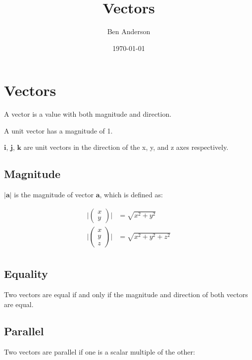 \documentclass[a4paper,11pt]{article}
\newcommand{\bb}{\boldsymbol}
\begin{document}
\title{Vectors}
\author{Ben Anderson}
\date{\today}
\maketitle
\pagebreak

\tableofcontents
\pagebreak




\section{Vectors}

A vector is a value with both magnitude and direction.

A unit vector has a magnitude of 1.

$\bb{i}$, $\bb{j}$, $\bb{k}$ are unit vectors in the direction of the x, y, and z axes respectively.


\subsection{Magnitude}

$|\bb{a}|$ is the magnitude of vector $\bb{a}$, which is defined as:

$$
\begin{aligned}
\lvert \begin{pmatrix} x\\ y \end{pmatrix} \rvert & = \sqrt{x^2 + y^2} \\
\lvert \begin{pmatrix} x\\ y\\ z \end{pmatrix} \rvert & = \sqrt{x^2 + y^2 + z^2} \\
\end{aligned}
$$


\subsection{Equality}

Two vectors are equal if and only if the magnitude and direction of both vectors
are equal.


\subsection{Parallel}

Two vectors are parallel if one is a scalar multiple of the other:
\end{document}

